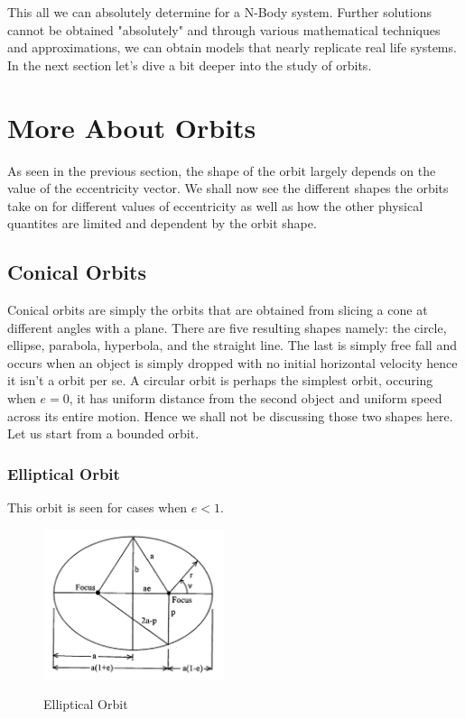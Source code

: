 \documentclass[12pt, letterpaper]{article}
\begin{document}
This all we can absolutely determine for a N-Body system. Further solutions cannot be obtained "absolutely" and through various mathematical techniques and approximations, we can obtain models that nearly replicate real life systems. In the next section let's dive a bit deeper into the study of orbits.

\newpage

\section{More About Orbits}
As seen in the previous section, the shape of the orbit largely depends on the value of the eccentricity vector. We shall now see the different shapes the orbits take on for different values of eccentricity as well as how the other physical quantites are limited and dependent by the orbit shape.
\subsection{Conical Orbits}

Conical orbits are simply the orbits that are obtained from slicing a cone at different angles with a plane. There are five resulting shapes namely: the circle, ellipse, parabola, hyperbola, and the straight line. The last is simply free fall and occurs when an object is simply dropped with no initial horizontal velocity hence it isn't a orbit per se. A circular orbit is perhaps the simplest orbit, occuring when $e=0$, it has uniform distance from the second object and uniform speed across its entire motion. Hence we shall not be discussing those two shapes here. Let us start from a bounded orbit.

\subsubsection{Elliptical Orbit}

This orbit is seen for cases when $e<1$. 

\begin{figure}[ht]
	\centering
    \includegraphics[width = 200px]{ellipse}
    \label{fig:ellipse}
    \caption{Elliptical Orbit}
\end{figure}
\end{document}
